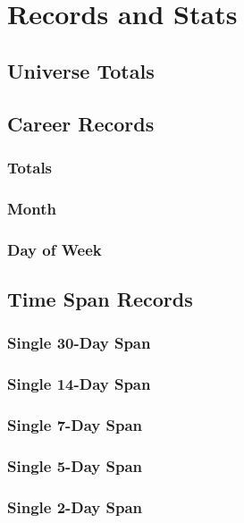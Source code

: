 \part{Records and Stats}
  \chapter{Universe Totals}
  \chapter{Career Records}
    \section{Totals}
      
    \section{Month}
      
    \section{Day of Week}

  \chapter{Time Span Records}
    \section{Single 30-Day Span}
    \section{Single 14-Day Span}
    \section{Single 7-Day Span}
    \section{Single 5-Day Span}
    \section{Single 2-Day Span}
